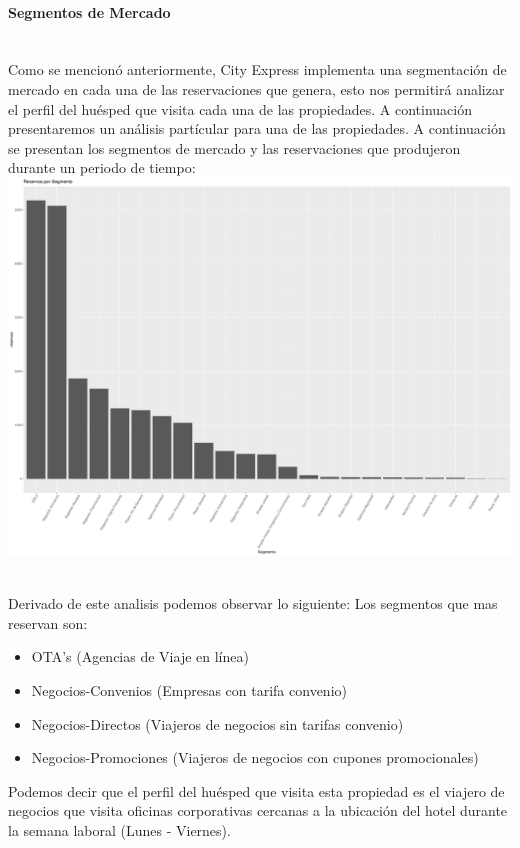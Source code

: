 \documentclass{article}\usepackage[]{graphicx}\usepackage[]{color}
\makeatletter
\def\maxwidth{ %
  \ifdim\Gin@nat@width>\linewidth
    \linewidth
  \else
    \Gin@nat@width
  \fi
}
\newenvironment{knitrout}{}{} %
\makeatother
\begin{document}
\paragraph{Segmentos de Mercado} ~\\
Como se mencionó anteriormente, City Express implementa una segmentación de mercado en cada una de las reservaciones que genera, esto nos permitirá analizar el perfil del huésped que visita cada una de las propiedades. A continuación presentaremos un análisis partícular para una de las propiedades.
A continuación se presentan los segmentos de mercado y las reservaciones que produjeron durante un periodo de tiempo:
~\\
\begin{knitrout}
\color{fgcolor}
\includegraphics[width=\maxwidth]{figures/SegmentosMercado-1} 

\end{knitrout}
~\\
Derivado de este analisis podemos observar lo siguiente:
Los segmentos que mas reservan son:
\begin{itemize}[noitemsep]
\item OTA's (Agencias de Viaje en línea)
\item Negocios-Convenios (Empresas con tarifa convenio)
\item Negocios-Directos (Viajeros de negocios sin tarifas convenio)
\item Negocios-Promociones (Viajeros de negocios con cupones promocionales)
\end{itemize}
Podemos decir que el perfil del huésped que visita esta propiedad es el viajero de negocios que visita oficinas corporativas cercanas a la ubicación del hotel durante la semana laboral (Lunes - Viernes).
\end{document}
